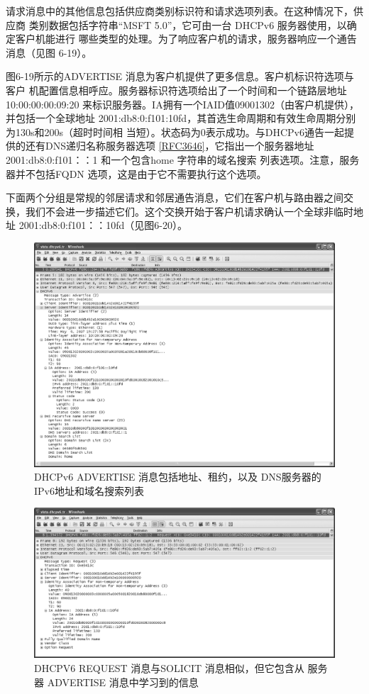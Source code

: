 请求消息中的其他信息包括供应商类别标识符和请求选项列表。在这种情况下，供应商
类别数据包括字符串“MSFT 5.0”，它可由一台 DHCPv6 服务器使用，以确定客户机能进行
哪些类型的处理。为了响应客户机的请求，服务器响应一个通告消息（见图 6-19）。

图6-19所示的ADVERTISE 消息为客户机提供了更多信息。客户机标识符选项与客户
机配置信息相呼应。服务器标识符选项给出了一个时间和一个链路层地址 10:00:00:00:09:20
来标识服务器。IA拥有一个IAID值09001302（由客户机提供），并包括一个全球地址
2001:db8:0:f101:10fd，其首选生命周期和有效生命周期分别为130s和200s（超时时间相
当短）。状态码为0表示成功。与DHCPv6通告一起提供的还有DNS递归名称服务器选项
\href{https://www.rfc-editor.org/rfc/rfc3646}{\href{https://www.rfc-editor.org/rfc/rfc3646}{[RFC3646]}}，它指出一个服务器地址
2001:db8:0:f101：：1 和一个包含home 字符串的域名搜索
列表选项。注意，服务器并不包括FQDN 选项，这是由于它不需要执行这个选项。

下面两个分组是常规的邻居请求和邻居通告消息，它们在客户机与路由器之间交
换，我们不会进一步描述它们。这个交换开始于客户机请求确认一个全球非临时地址
2001:db8:0:f101：：10fd（见图6-20）。

\begin{figure}[H]
  \centering
  \includegraphics[scale=0.5]{imgs/6/6-19.png}
  \caption{DHCPv6 ADVERTISE 消息包括地址、租约，以及 DNS服务器的IPv6地址和域名搜索列表}
\end{figure}

\begin{figure}[H]
  \centering
  \includegraphics[scale=0.5]{imgs/6/6-20.png}
  \caption{DHCPV6 REQUEST 消息与SOLICIT 消息相似，但它包含从
  服务器 ADVERTISE 消息中学习到的信息}
\end{figure}

